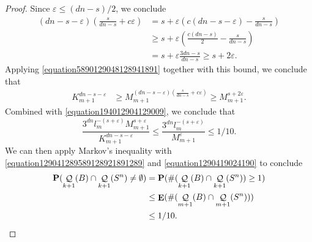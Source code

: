 \documentclass[12pt,reqno]{article}
\numberwithin{equation}{section}
\DeclareMathOperator{\EE}{\mathbf{E}}
\DeclareMathOperator{\DQ}{\mathcal{Q}}
\begin{document}
\begin{proof}
    Since $\varepsilon \leq (dn - s)/2$, we conclude
    \begin{align*}
        \left( dn - s - \varepsilon \right) \left( \frac{s}{dn - s} + c\varepsilon \right) &= s + \varepsilon \left( c(dn - s - \varepsilon) - \frac{s}{dn - s} \right)\\
        &\geq s + \varepsilon \left( \frac{c(dn - s)}{2} - \frac{s}{dn - s} \right)\\
        &= s + \varepsilon \frac{3dn - s}{dn - s} \geq s + 2\varepsilon.
    \end{align*}
    Applying \eqref{equation5890129048128941891} together with this bound, we conclude that
    \begin{align*}
        K_{m+1}^{dn - s - \varepsilon} &\geq M_{m+1}^{(dn - s - \varepsilon) \left( \frac{s}{dn - s} + c\varepsilon \right)} \geq M_{m+1}^{s + 2 \varepsilon}.
    \end{align*}
    Combined with \eqref{equation194012904129009}, we conclude that
    \begin{equation} \label{equation1290419024190}
        \frac{3^{dn} l_m^{-(s + \varepsilon)} M_{m+1}^{s + \varepsilon}}{K_{m+1}^{dn - s - \varepsilon}} \leq \frac{3^{dn} l_m^{-(s + \varepsilon)}}{M_{m+1}^\varepsilon} \leq 1/10.
    \end{equation}
    We can then apply Markov's inequality with \eqref{equation129041289589128921891289} and \eqref{equation1290419024190} to conclude
    \begin{equation} \label{fourierdim2}
    \begin{split}
        \mathbf{P}(\DQ_{k+1}(B) \cap \DQ_{k+1}(S^n) \neq \emptyset) &= \mathbf{P}(\# (\DQ_{k+1}(B) \cap \DQ_{k+1}(S^n)) \geq 1)\\
        &\leq \EE(\#(\DQ_{m+1}(B) \cap \DQ_{m+1}(S^n)))\\
        &\leq 1/10. \qedhere
    \end{split}
    \end{equation}
\end{proof}
\end{document}
